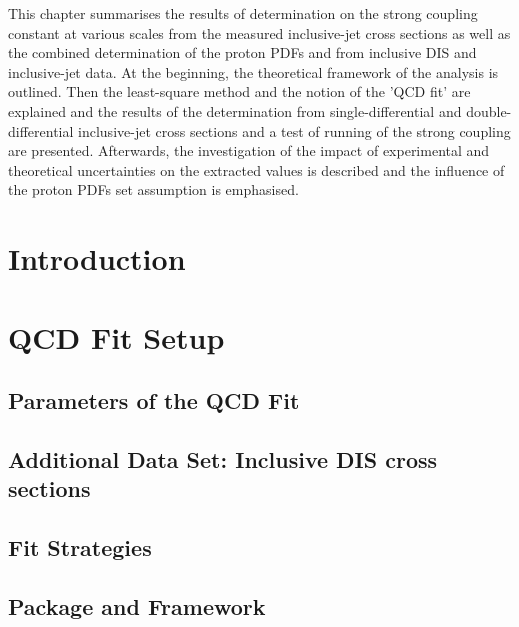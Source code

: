 This chapter summarises the results of determination on the strong coupling constant at various scales from the measured inclusive-jet cross sections as well as the combined determination of the proton PDFs and \asz from inclusive DIS and inclusive-jet data. At the beginning, the theoretical framework of the analysis is outlined. Then the least-square method and the notion of the 'QCD fit' are explained and the results of the \asz determination from single-differential and double-differential inclusive-jet cross sections and a test of running of the strong coupling are presented. Afterwards, the investigation of the impact of experimental and theoretical uncertainties on the extracted \asz values is described and the influence of the proton PDFs set assumption is emphasised. %

\section{Introduction}
\label{sec:qcdfitintro}


\section{QCD Fit Setup}
\label{sec:fitsettings}


\subsection{Parameters of the QCD Fit}
\label{subsec:qcdfitparams}


\subsection{Additional Data Set: Inclusive DIS cross sections}
\label{subsec:inclusivedisdata}


\subsection{Fit Strategies}
\label{subsec:fitstategy}


\subsection{\herafitter Package and \fastnlo Framework}
\label{subsec:herfitter}


